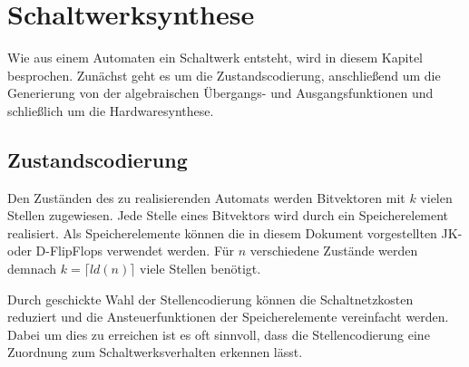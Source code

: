 \chapter{Schaltwerksynthese}
Wie aus einem Automaten ein Schaltwerk entsteht, wird in diesem Kapitel besprochen. Zunächst geht es um die Zustandscodierung, anschließend um die Generierung von der algebraischen Übergangs- und Ausgangsfunktionen und schließlich um die Hardwaresynthese.   

\section{Zustandscodierung}
Den Zuständen des zu realisierenden Automats werden Bitvektoren mit $k$ vielen Stellen zugewiesen. Jede Stelle eines Bitvektors wird durch ein Speicherelement realisiert. Als Speicherelemente können die in diesem Dokument vorgestellten JK- oder D-FlipFlops verwendet werden. Für $n$ verschiedene Zustände werden demnach $k = \lceil ld(n) \rceil$ viele Stellen benötigt.

Durch geschickte Wahl der Stellencodierung können die Schaltnetzkosten reduziert und die Ansteuerfunktionen der Speicherelemente vereinfacht werden. Dabei um dies zu erreichen ist es oft sinnvoll, dass die Stellencodierung eine Zuordnung zum Schaltwerksverhalten erkennen lässt. 
% 
% 

